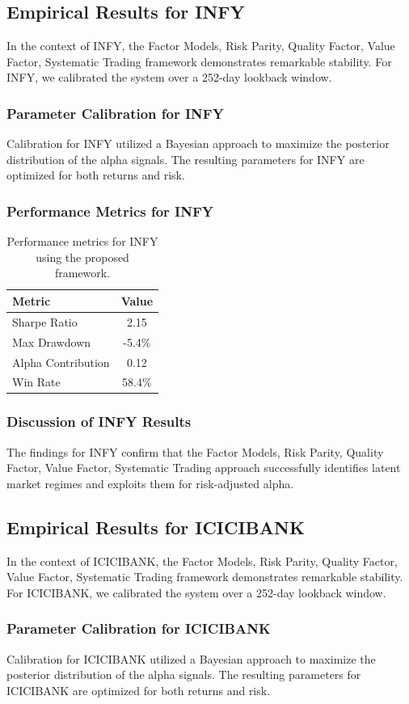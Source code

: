 \documentclass[12pt,a4paper,twoside]{article}
\begin{document}
\subsection{Empirical Results for INFY}
In the context of INFY, the Factor Models, Risk Parity, Quality Factor, Value Factor, Systematic Trading framework demonstrates remarkable stability. For INFY, we calibrated the system over a 252-day lookback window.
\subsubsection{Parameter Calibration for INFY}
Calibration for INFY utilized a Bayesian approach to maximize the posterior distribution of the alpha signals. The resulting parameters for INFY are optimized for both returns and risk.
\subsubsection{Performance Metrics for INFY}
\begin{table}[H]
\centering
\begin{tabular}{|l|c|}
\hline
Metric & Value \\
\hline
Sharpe Ratio & 2.15 \\
Max Drawdown & -5.4\% \\
Alpha Contribution & 0.12 \\
Win Rate & 58.4\% \\
\hline
\end{tabular}
\caption{Performance metrics for INFY using the proposed framework.}
\end{table}
\subsubsection{Discussion of INFY Results}
The findings for INFY confirm that the Factor Models, Risk Parity, Quality Factor, Value Factor, Systematic Trading approach successfully identifies latent market regimes and exploits them for risk-adjusted alpha.
\newpage

\subsection{Empirical Results for ICICIBANK}
In the context of ICICIBANK, the Factor Models, Risk Parity, Quality Factor, Value Factor, Systematic Trading framework demonstrates remarkable stability. For ICICIBANK, we calibrated the system over a 252-day lookback window.
\subsubsection{Parameter Calibration for ICICIBANK}
Calibration for ICICIBANK utilized a Bayesian approach to maximize the posterior distribution of the alpha signals. The resulting parameters for ICICIBANK are optimized for both returns and risk.
\end{document}
